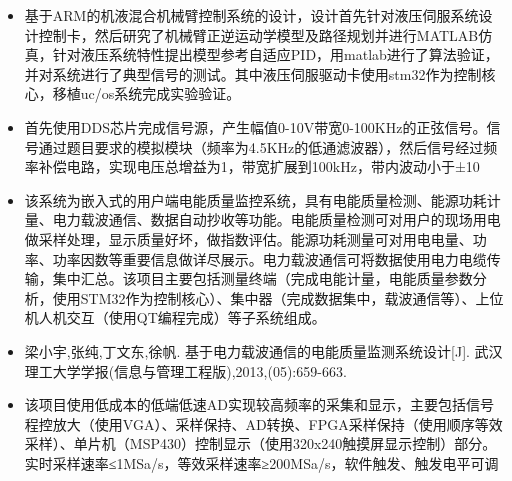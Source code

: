 \documentclass{resume}
\begin{document}
\begin{itemize}\small
  \item 基于ARM的机液混合机械臂控制系统的设计，设计首先针对液压伺服系统设计控制卡，然后研究了机械臂正逆运动学模型及路径规划并进行MATLAB仿真，针对液压系统特性提出模型参考自适应PID，用matlab进行了算法验证，并对系统进行了典型信号的测试。其中液压伺服驱动卡使用stm32作为控制核心，移植uc/os系统完成实验验证。
\end{itemize}
\begin{itemize}\small
  \item 首先使用DDS芯片完成信号源，产生幅值0-10V带宽0-100KHz的正弦信号。信号通过题目要求的模拟模块（频率为4.5KHz的低通滤波器），然后信号经过频率补偿电路，实现电压总增益为1，带宽扩展到100kHz，带内波动小于±10%
\end{itemize}
\begin{itemize}\small
  \item 该系统为嵌入式的用户端电能质量监控系统，具有电能质量检测、能源功耗计量、电力载波通信、数据自动抄收等功能。电能质量检测可对用户的现场用电做采样处理，显示质量好坏，做指数评估。能源功耗测量可对用电电量、功率、功率因数等重要信息做详尽展示。电力载波通信可将数据使用电力电缆传输，集中汇总。该项目主要包括测量终端（完成电能计量，电能质量参数分析，使用STM32作为控制核心）、集中器（完成数据集中，载波通信等）、上位机人机交互（使用QT编程完成）等子系统组成。
  \item 梁小宇,张纯,{\color{red}丁文东},徐帆. 基于电力载波通信的电能质量监测系统设计[J]. 武汉理工大学学报(信息与管理工程版),2013,(05):659-663.
\end{itemize}

\begin{itemize}\small
  \item 该项目使用低成本的低端低速AD实现较高频率的采集和显示，主要包括信号程控放大（使用VGA）、采样保持、AD转换、FPGA采样保持（使用顺序等效采样）、单片机（MSP430）控制显示（使用320x240触摸屏显示控制）部分。实时采样速率≤1MSa/s，等效采样速率≥200MSa/s，软件触发、触发电平可调
\end{itemize}
\end{document}

